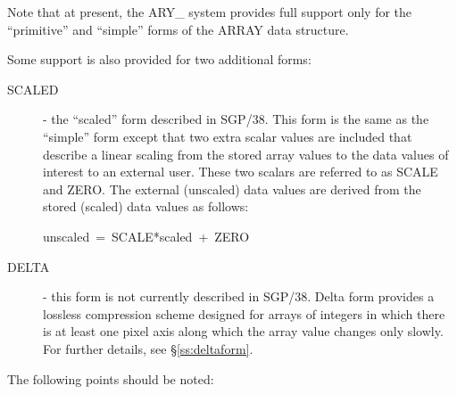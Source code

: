 \documentclass[twoside,11pt,nolof]{starlink}
\begin{document}
Note that at present, the ARY\_ system provides full support only for the
``primitive'' and ``simple'' forms of the ARRAY data structure.

Some support is also provided for two additional forms:

\begin{description}
\item[SCALED] - the ``scaled'' form described in SGP/38. This form is the
same as the ``simple'' form except that two
extra scalar values are included that describe a linear scaling from the
stored array values to the data values of interest to an external user.
These two scalars are referred to as SCALE and ZERO. The external
(unscaled) data values are derived from the stored (scaled) data values
as follows:

unscaled\ =\ SCALE*scaled\ +\ ZERO

\item[DELTA] - this form is not currently described in SGP/38. Delta form
provides a lossless compression scheme designed for arrays of integers in
which there is at least one pixel axis along which the array value changes
only slowly. For further details, see \S\ref{ss:deltaform}.

\end{description}

The following points should be noted:
\end{document}
